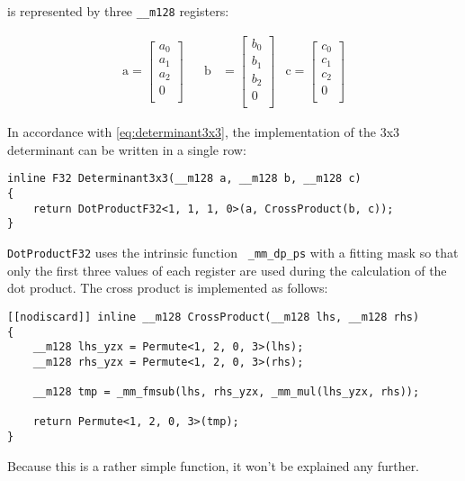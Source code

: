 is represented by three \texttt{__m128} registers:

\begin{align*}
\mathrm{a} 
=
\begin{bmatrix}
a_0\\
a_1\\
a_2\\
0\\
\end{bmatrix}
&&
\mathrm{b} 
&=
\begin{bmatrix}
b_0\\
b_1\\
b_2\\
0\\
\end{bmatrix}
&
\mathrm{c} 
=
\begin{bmatrix}
c_0\\
c_1\\
c_2\\
0\\
\end{bmatrix}
\end{align*}

In accordance with \cref{eq:determinant3x3}, the implementation of the 3x3 determinant can be written in a single row:

\begin{verbatim}
inline F32 Determinant3x3(__m128 a, __m128 b, __m128 c)
{
    return DotProductF32<1, 1, 1, 0>(a, CrossProduct(b, c));
}
\end{verbatim}

\texttt{DotProductF32} uses the intrinsic function \texttt{ _mm_dp_ps} with a fitting mask so that only the first three values of each register are used during the calculation of the dot product. 
The cross product is implemented as follows:

\begin{verbatim}
[[nodiscard]] inline __m128 CrossProduct(__m128 lhs, __m128 rhs)
{
    __m128 lhs_yzx = Permute<1, 2, 0, 3>(lhs);
    __m128 rhs_yzx = Permute<1, 2, 0, 3>(rhs);

    __m128 tmp = _mm_fmsub(lhs, rhs_yzx, _mm_mul(lhs_yzx, rhs));

    return Permute<1, 2, 0, 3>(tmp);
}
\end{verbatim}

Because this is a rather simple function, it won't be explained any further.



\newpage
